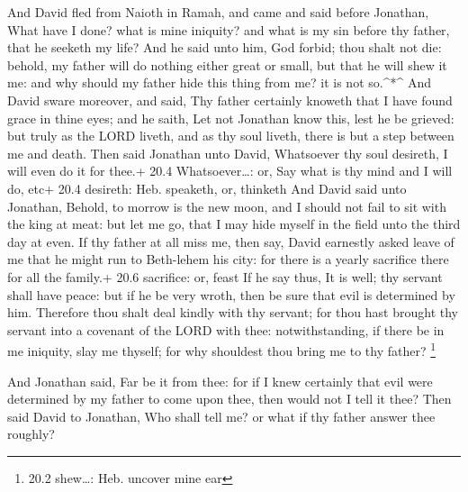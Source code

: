  And David fled from Naioth in Ramah, and came and said
before Jonathan, What have I done? what is mine iniquity? and what is my
sin before thy father, that he seeketh my life?  And he said
unto him, God forbid; thou shalt not die: behold, my father will do
nothing either great or small, but that he will shew it me: and why
should my father hide this thing from me? it is not so.\^{}*\^{}
 And David sware moreover, and said, Thy father certainly
knoweth that I have found grace in thine eyes; and he saith, Let not
Jonathan know this, lest he be grieved: but truly as the LORD liveth,
and as thy soul liveth, there is but a step between me and death.
 Then said Jonathan unto David, Whatsoever thy soul
desireth, I will even do it for thee.+ 20.4 Whatsoever\ldots: or, Say
what is thy mind and I will do, etc+ 20.4 desireth: Heb. speaketh, or,
thinketh  And David said unto Jonathan, Behold, to morrow is
the new moon, and I should not fail to sit with the king at meat: but
let me go, that I may hide myself in the field unto the third day at
even.  If thy father at all miss me, then say, David
earnestly asked leave of me that he might run to Beth-lehem his city:
for there is a yearly sacrifice there for all the family.+ 20.6
sacrifice: or, feast  If he say thus, It is well; thy
servant shall have peace: but if he be very wroth, then be sure that
evil is determined by him.  Therefore thou shalt deal kindly
with thy servant; for thou hast brought thy servant into a covenant of
the LORD with thee: notwithstanding, if there be in me iniquity, slay me
thyself; for why shouldest thou bring me to thy father? \footnote{20.2
  shew\ldots: Heb. uncover mine ear}

 And Jonathan said, Far be it from thee: for if I knew
certainly that evil were determined by my father to come upon thee, then
would not I tell it thee?  Then said David to Jonathan, Who
shall tell me? or what if thy father answer thee roughly?


